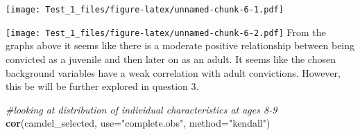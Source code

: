 \documentclass[]{article}
\newenvironment{Shaded}{\begin{snugshade}}{\end{snugshade}}
\newcommand{\KeywordTok}[1]{\textcolor[rgb]{0.13,0.29,0.53}{\textbf{#1}}}
\newcommand{\DataTypeTok}[1]{\textcolor[rgb]{0.13,0.29,0.53}{#1}}
\newcommand{\DecValTok}[1]{\textcolor[rgb]{0.00,0.00,0.81}{#1}}
\newcommand{\StringTok}[1]{\textcolor[rgb]{0.31,0.60,0.02}{#1}}
\newcommand{\CommentTok}[1]{\textcolor[rgb]{0.56,0.35,0.01}{\textit{#1}}}
\newcommand{\OperatorTok}[1]{\textcolor[rgb]{0.81,0.36,0.00}{\textbf{#1}}}
\newcommand{\NormalTok}[1]{#1}
\begin{document}
\texttt{[image: Test\_1\_files/figure-latex/unnamed-chunk-6-1.pdf]}

\begin{Shaded}
\end{Shaded}

\texttt{[image: Test\_1\_files/figure-latex/unnamed-chunk-6-2.pdf]} From
the graphs above it seems like there is a moderate positive relationship
between being convicted as a juvenile and then later on as an adult. It
seems like the chosen background variables have a weak correlation with
adult convictions. However, this be will be further explored in question
3.

\begin{Shaded}
\begin{Highlighting}[]
\CommentTok{#looking at distribution of individual characteristics at ages 8-9}
\KeywordTok{cor}\NormalTok{(camdel_selected, }\DataTypeTok{use=}\StringTok{"complete.obs"}\NormalTok{, }\DataTypeTok{method=}\StringTok{"kendall"}\NormalTok{)}
\end{Highlighting}
\end{Shaded}
\end{document}
